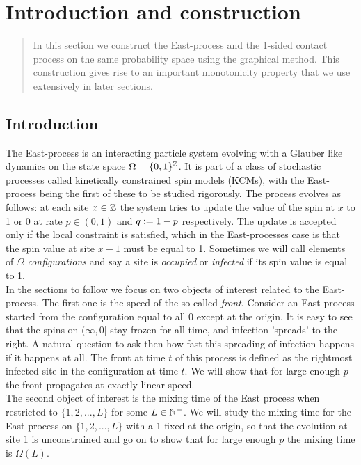 \section{Introduction and construction}\label{dec:introduction}
\label{sec:basic_coupling}

\begin{quote}
{\small In this section we construct the East-process and the 1-sided contact process on the same probability space using the graphical method. This construction gives rise to an important monotonicity property that we use extensively in later sections. }
\end{quote}

\subsection{Introduction}\label{ssec:introduction}
The East-process is an interacting particle system evolving with a Glauber like dynamics on the state space $\Omega = \{0,1\}^{\mathbb{Z}}$. It is part of a class of stochastic processes called kinetically constrained spin models (KCMs), with the East-process being the first of these to be studied rigorously. The process evolves as follows: at each site $x \in \mathbb{Z}$ the system tries to update the value of the spin at $x$ to 1 or 0 at rate $p \in (0,1)$ and $q \vcentcolon= 1 - p$ respectively. The update is accepted only if the local constraint is satisfied, which in the East-processes case is that the spin value at site $x-1$ must be equal to 1. Sometimes we will call elements of $\Omega$ \textit{configurations} and say a site is \textit{occupied} or \textit{infected} if its spin value is equal to 1. \\

In the sections to follow we focus on two objects of interest related to the East-process. The first one is the speed of the so-called \textit{front}. Consider an East-process started from the configuration equal to all 0 except at the origin. It is easy to see that the spins on $(\infty, 0]$ stay frozen for all time, and infection 'spreads' to the right. A natural question to ask then how fast this spreading of infection happens if it happens at all. The front at time $t$ of this process is defined as the rightmost infected site in the configuration at time $t$. We will show that for large enough $p$ the front propagates at exactly linear speed. \\

The second object of interest is the mixing time of the East process when restricted to $\{ 1, 2, ..., L\}$ for some $L \in \mathbb{N}^+$. We will study the mixing time for the East-process on $\{ 1, 2, ..., L\}$ with a 1 fixed at the origin, so that the evolution at site 1 is unconstrained and go on to show that for large enough $p$ the mixing time is $\Omega(L)$.  \\

